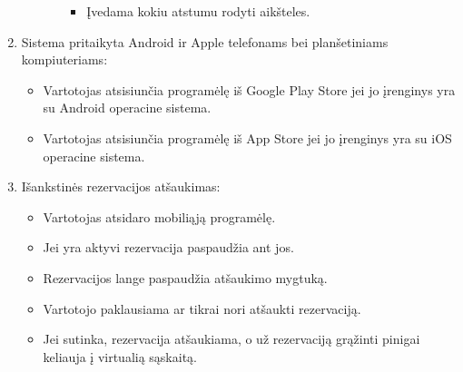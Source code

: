 \documentclass{VUMIFPSkursinis}
\begin{document}
\begin{enumerate}
\begin{itemize}
\begin{itemize}
						\begin{itemize}
							\item Įvedama kokiu atstumu rodyti aikšteles.
						\end{itemize}
				\end{itemize}
		\end{itemize}
	\item Sistema pritaikyta Android ir Apple telefonams bei planšetiniams kompiuteriams:
		\begin{itemize}
			\item Vartotojas atsisiunčia programėlę iš Google Play Store jei jo įrenginys yra su Android operacine sistema.
			\item Vartotojas atsisiunčia programėlę iš App Store jei jo įrenginys yra su iOS operacine sistema.
		\end{itemize}
	\item Išankstinės rezervacijos atšaukimas:
		\begin{itemize}
			\item Vartotojas atsidaro mobiliąją programėlę.
			\item Jei yra aktyvi rezervacija paspaudžia ant jos.
			\item Rezervacijos lange paspaudžia atšaukimo mygtuką.
			\item Vartotojo paklausiama ar tikrai nori atšaukti rezervaciją.
			\item Jei sutinka, rezervacija atšaukiama, o už rezervaciją grąžinti pinigai keliauja į virtualią sąskaitą.
		\end{itemize}		
\end{enumerate}
\end{document}
